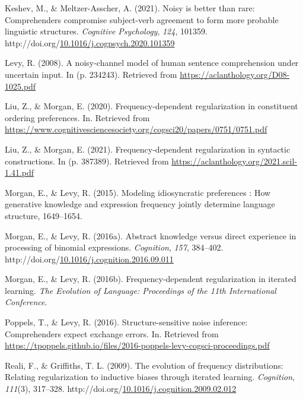 \documentclass[10pt, letterpaper]{article}
\newenvironment{CSLReferences}%
  {}%
  {\par}
\begin{document}
\begin{CSLReferences}{1}{0}
\leavevmode{}%
Keshev, M., \& Meltzer-Asscher, A. (2021). Noisy is better than rare:
Comprehenders compromise subject-verb agreement to form more probable
linguistic structures. \emph{Cognitive Psychology}, \emph{124}, 101359.
http://doi.org/\href{https://doi.org/10.1016/j.cogpsych.2020.101359}{10.1016/j.cogpsych.2020.101359}

\leavevmode{}%
Levy, R. (2008). A noisy-channel model of human sentence comprehension
under uncertain input. In (p. 234243). Retrieved from
\url{https://aclanthology.org/D08-1025.pdf}

\leavevmode{}%
Liu, Z., \& Morgan, E. (2020). Frequency-dependent regularization in
constituent ordering preferences. In. Retrieved from
\url{https://www.cognitivesciencesociety.org/cogsci20/papers/0751/0751.pdf}

\leavevmode{}%
Liu, Z., \& Morgan, E. (2021). Frequency-dependent regularization in
syntactic constructions. In (p. 387389). Retrieved from
\url{https://aclanthology.org/2021.scil-1.41.pdf}

\leavevmode{}%
Morgan, E., \& Levy, R. (2015). Modeling idiosyncratic preferences : How
generative knowledge and expression frequency jointly determine language
structure, 1649--1654.

\leavevmode{}%
Morgan, E., \& Levy, R. (2016a). Abstract knowledge versus direct
experience in processing of binomial expressions. \emph{Cognition},
\emph{157}, 384--402.
http://doi.org/\href{https://doi.org/10.1016/j.cognition.2016.09.011}{10.1016/j.cognition.2016.09.011}

\leavevmode{}%
Morgan, E., \& Levy, R. (2016b). Frequency-dependent regularization in
iterated learning. \emph{The Evolution of Language: Proceedings of the
11th International Conference}.

\leavevmode{}%
Poppels, T., \& Levy, R. (2016). Structure-sensitive noise inference:
Comprehenders expect exchange errors. In. Retrieved from
\url{https://tpoppels.github.io/files/2016-poppels-levy-cogsci-proceedings.pdf}

\leavevmode{}%
Reali, F., \& Griffiths, T. L. (2009). The evolution of frequency
distributions: Relating regularization to inductive biases through
iterated learning. \emph{Cognition}, \emph{111}(3), 317--328.
http://doi.org/\href{https://doi.org/10.1016/j.cognition.2009.02.012}{10.1016/j.cognition.2009.02.012}


\end{CSLReferences}
\end{document}
